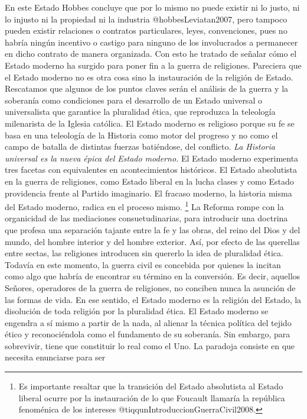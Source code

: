 \documentclass[
]{article}
\begin{document}
En este Estado Hobbes concluye que por lo mismo no puede existir ni lo
justo, ni lo injusto ni la propiedad ni la industria
@hobbesLeviatan2007, pero tampoco pueden existir relaciones o contratos
particulares, leyes, convenciones, pues no habría ningún incentivo o
castigo para ninguno de los involucrados a permanecer en dicho contrato
de manera organizada. Con esto he tratado de señalar cómo el Estado
moderno ha surgido para poner fin a la guerra de religiones. Pareciera
que el Estado moderno no es otra cosa sino la instauración de la
religión de Estado. Rescatamos que algunos de los puntos claves serán el
análisis de la guerra y la soberanía como condiciones para el desarrollo
de un Estado universal o universalista que garantice la pluralidad
ética, que reproduzca la teleología milenarista de la Iglesia católica.
El Estado moderno es religioso porque su fe se basa en una teleología de
la Historia como motor del progreso y no como el campo de batalla de
distintas fuerzas batiéndose, del conflicto. \emph{La Historia universal
es la nueva épica del Estado moderno.} El Estado moderno experimenta
tres facetas con equivalentes en acontecimientos históricos. El Estado
absolutista en la guerra de religiones, como Estado liberal en la lucha
clases y como Estado providencia frente al Partido imaginario. El
fracaso moderno, la historia misma del Estado moderno, radica en el
proceso mismo. \footnote{Es importante resaltar que la transición del
  Estado absolutista al Estado liberal ocurre por la instauración de lo
  que Foucault llamaría la república fenoménica de los intereses
  @tiqqunIntroduccionGuerraCivil2008.} La Reforma rompe con la
organicidad de las mediaciones consuetudinarias, para introducir una
doctrina que profesa una separación tajante entre la fe y las obras, del
reino del Dios y del mundo, del hombre interior y del hombre exterior.
Así, por efecto de las querellas entre sectas, las religiones introducen
sin quererlo la idea de pluralidad ética. Todavía en este momento, la
guerra civil es concebida por quienes la incitan como algo que habría de
encontrar su término en la conversión. Es decir, aquellos Señores,
operadores de la guerra de religiones, no conciben nunca la asunción de
las formas de vida. En ese sentido, el Estado moderno es la religión del
Estado, la disolución de toda religión por la pluralidad ética. El
Estado moderno se engendra a sí mismo a partir de la nada, al alienar la
técnica política del tejido ético y reconociéndola como el fundamento de
su soberanía. Sin embargo, para sobrevivir, tiene que constituir lo real
como el Uno. La paradoja consiste en que necesita enunciarse para ser
\end{document}
